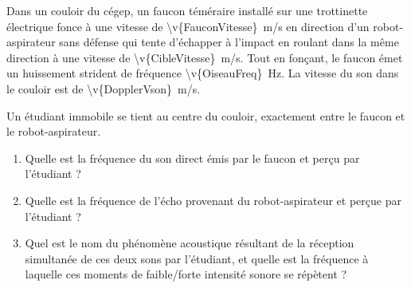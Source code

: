 Dans un couloir du cégep, un faucon téméraire installé sur une trottinette électrique fonce à une vitesse de \qty{\v{FauconVitesse}}{m/s} en direction d'un robot-aspirateur sans défense qui tente d'échapper à l'impact en roulant dans la même direction à une vitesse de \qty{\v{CibleVitesse}}{m/s}. Tout en fonçant, le faucon émet un huissement strident de fréquence \qty{\v{OiseauFreq}}{Hz}. La vitesse du son dans le couloir est de \qty{\v{DopplerVson}}{m/s}.

Un étudiant immobile se tient au centre du couloir, exactement entre le faucon et le robot-aspirateur.
    \begin{enumerate}[label=\alph*)]
        \item Quelle est la fréquence du son direct émis par le faucon et perçu par l'étudiant ?
        \item Quelle est la fréquence de l'écho provenant du robot-aspirateur et perçue par l'étudiant ?
        \item Quel est le nom du phénomène acoustique résultant de la réception simultanée de ces deux sons par l'étudiant, et quelle est la fréquence à laquelle ces moments de faible/forte intensité sonore se répètent ?
    \end{enumerate}

\vspace{0.4cm}